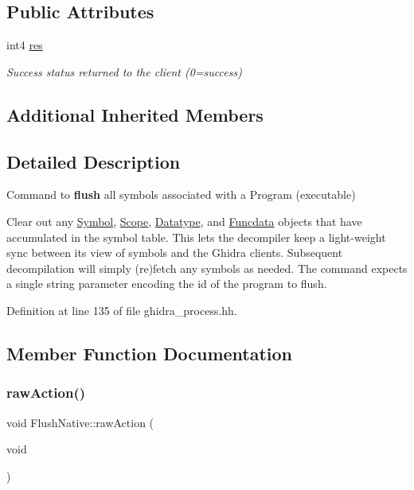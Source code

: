 \subsection*{Public Attributes}
\begin{DoxyCompactItemize}
\item 
int4 \mbox{\hyperlink{class_flush_native_a055504c13f53d5647e26054e3ff82ff0}{res}}
\begin{DoxyCompactList}\small\item\em Success status returned to the client (0=success) \end{DoxyCompactList}\end{DoxyCompactItemize}
\subsection*{Additional Inherited Members}


\subsection{Detailed Description}
Command to {\bfseries{flush}} all symbols associated with a Program (executable) 

Clear out any \mbox{\hyperlink{class_symbol}{Symbol}}, \mbox{\hyperlink{class_scope}{Scope}}, \mbox{\hyperlink{class_datatype}{Datatype}}, and \mbox{\hyperlink{class_funcdata}{Funcdata}} objects that have accumulated in the symbol table. This lets the decompiler keep a light-\/weight sync between its view of symbols and the Ghidra client\textquotesingle{}s. Subsequent decompilation will simply (re)fetch any symbols as needed. The command expects a single string parameter encoding the id of the program to flush. 

Definition at line 135 of file ghidra\+\_\+process.\+hh.



\subsection{Member Function Documentation}
\mbox{\label{class_flush_native_a92fb03dcd3fb080a2033442403cde93c}} 
\subsubsection{\texorpdfstring{rawAction()}{rawAction()}}
{\footnotesize\ttfamily void Flush\+Native\+::raw\+Action (\begin{DoxyParamCaption}\item[{void}]{ }\end{DoxyParamCaption})\hspace{0.3cm}{\ttfamily [virtual]}}



